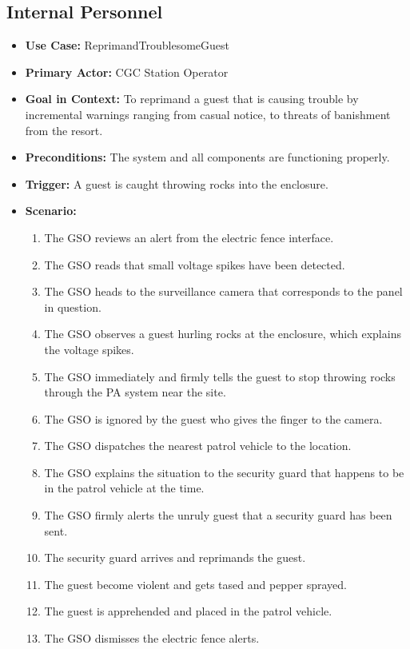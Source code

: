 \documentclass[12pt]{article}
\begin{document}
\subsection{Internal Personnel}
    \begin{itemize}
        \item[]\textbf{Use Case:}                                
            ReprimandTroublesomeGuest

        \item[]\textbf{Primary Actor:}
            CGC Station Operator

        \item[]\textbf{Goal in Context:}
            To reprimand a guest that is causing trouble by incremental warnings ranging from
            casual notice, to threats of banishment from the resort.

        \item[]\textbf{Preconditions:}
            The system and all components are functioning properly.

        \item[]\textbf{Trigger:}
            A guest is caught throwing rocks into the enclosure.
            
        \item[]\textbf{Scenario:}
            \begin{enumerate}
                \item The GSO reviews an alert from the electric fence interface.
                \item The GSO reads that small voltage spikes have been detected.
                \item The GSO heads to the surveillance camera that corresponds to the
                panel in question.
                \item The GSO observes a guest hurling rocks at the enclosure, which
                explains the voltage spikes.
                \item The GSO immediately and firmly tells the guest to stop throwing rocks
                through the PA system near the site.
                \item The GSO is ignored by the guest who gives the finger to the camera.
                \item The GSO dispatches the nearest patrol vehicle to the location.
                \item The GSO explains the situation to the security guard that happens 
                to be in the patrol vehicle at the time.
                \item The GSO firmly alerts the unruly guest that a security guard has been sent.
                \item The security guard arrives and reprimands the guest.
                \item The guest become violent and gets tased and pepper sprayed.
                \item The guest is apprehended and placed in the patrol vehicle.
                \item The GSO dismisses the electric fence alerts.
            \end{enumerate}


\end{itemize}
\end{document}
